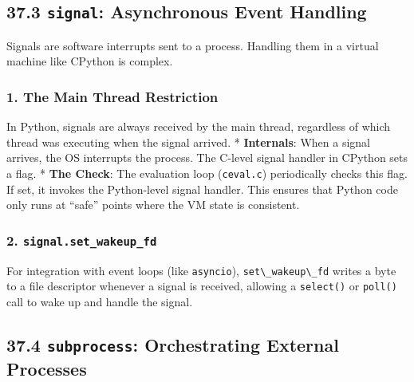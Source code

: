 \hypertarget{signal-asynchronous-event-handling}{%
\subsection{\texorpdfstring{37.3 \texttt{signal}: Asynchronous Event
Handling}{37.3 signal: Asynchronous Event Handling}}\label{signal-asynchronous-event-handling}}

Signals are software interrupts sent to a process. Handling them in a
virtual machine like CPython is complex.

\hypertarget{the-main-thread-restriction}{%
\subsubsection{1. The Main Thread
Restriction}\label{the-main-thread-restriction}}

In Python, signals are always received by the main thread, regardless of
which thread was executing when the signal arrived. *
\textbf{Internals}: When a signal arrives, the OS interrupts the
process. The C-level signal handler in CPython sets a flag. *
\textbf{The Check}: The evaluation loop
(\passthrough{\lstinline!ceval.c!}) periodically checks this flag. If
set, it invokes the Python-level signal handler. This ensures that
Python code only runs at ``safe'' points where the VM state is
consistent.

\hypertarget{signal.set_wakeup_fd}{%
\subsubsection{\texorpdfstring{2.
\texttt{signal.set\_wakeup\_fd}}{2. signal.set\_wakeup\_fd}}\label{signal.set_wakeup_fd}}

For integration with event loops (like
\passthrough{\lstinline!asyncio!}),
\passthrough{\lstinline!set\_wakeup\_fd!} writes a byte to a file
descriptor whenever a signal is received, allowing a
\passthrough{\lstinline!select()!} or \passthrough{\lstinline!poll()!}
call to wake up and handle the signal.

\hypertarget{subprocess-orchestrating-external-processes}{%
\subsection{\texorpdfstring{37.4 \texttt{subprocess}: Orchestrating
External
Processes}{37.4 subprocess: Orchestrating External Processes}}\label{subprocess-orchestrating-external-processes}}

